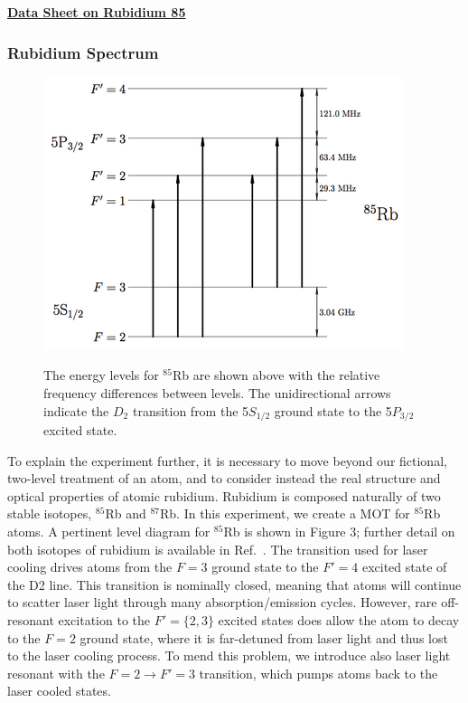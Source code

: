 \documentclass{../lab}
\begin{document}
\href{http://physics111.lib.berkeley.edu/Physics111/Reprints/MOT/rubidium85numbers.pdf}{\textbf{\textbf{Data Sheet on Rubidium 85}}}

\subsubsection{Rubidium Spectrum}
\label{subsubsec:RubidiumSpectrum}

\begin{figure}[h]
    \centering
    \href{http://experimentationlab.berkeley.edu/sites/default/files/images/400px-MOTimage005.png}{\includegraphics[width=0.5\linewidth]{images/400px-MOTimage005.png}}
    \caption{The energy levels for $^{85}$Rb are shown above with the relative frequency differences between levels. The unidirectional arrows indicate the $D_2$ transition from the 5$S_{1/2}$ ground state to the 5$P_{3/2}$ excited state.}
    \label{fig:400px-MOTimage005}
\end{figure}

To explain the experiment further, it is necessary to move beyond our fictional, two-level treatment of an atom, and to consider instead the real structure and optical properties of atomic rubidium. Rubidium is composed naturally of two stable isotopes, $^{85}$Rb and $^{87}$Rb. In this experiment, we create a MOT for $^{85}$Rb atoms. A pertinent level diagram for $^{85}$Rb is shown in Figure 3; further detail on both isotopes of rubidium is available in Ref.~\cite{Steck}. The transition used for laser cooling drives atoms from the $F = 3$ ground state to the $F' = 4$ excited state of the D2 line. This transition is nominally closed, meaning that atoms will continue to scatter laser light through many absorption/emission cycles. However, rare off-resonant excitation to the $F' = \{2,3\}$ excited states does allow the atom to decay to the $F = 2$ ground state, where it is far-detuned from laser light and thus lost to the laser cooling process. To mend this problem, we introduce also laser light resonant with the $F = 2 \rightarrow F' = 3$ transition, which pumps atoms back to the laser cooled states.
\end{document}
